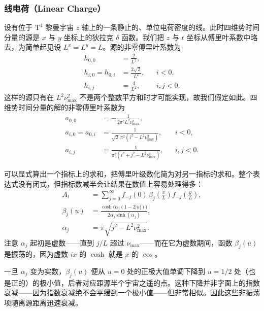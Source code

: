 \subsubsection{线电荷（Linear Charge）}

设有位于 $\text{T}^{4}$ 黎曼宇宙 $z$ 轴上的一条静止的、单位电荷密度的线。此时四维势时间分量的源是 $x$ 与 $y$ 坐标上的狄拉克 $\delta$ 函数。我们把 $z$ 与 $t$ 坐标从傅里叶系数中略去，为简单起见设 $L^{x}=L^{y}=L$。源的非零傅里叶系数为
\begin{align}
h_{0,0} &= \frac{2}{L^{2}},\\
h_{i,0} = h_{0,i} &= \frac{2\sqrt2}{L^{2}}, && i<0,\\
h_{i,j} &= \frac{4}{L^{2}}, && i,j<0.
\end{align}
这样的源只有在 $L^{2}\nu_{\max}^{2}$ 不是两个整数平方和时才可能实现，故我们假定如此。四维势时间分量的解的非零傅里叶系数为
\begin{align}
a_{0,0} &= -\frac{1}{2\pi^{2} L^{2}\nu_{\max}^{2}},\\
a_{i,0} = a_{0,i} &= \frac{1}{\sqrt2\,\pi^{2}(i^{2}-L^{2}\nu_{\max}^{2})}, && i<0,\\
a_{i,j} &= \frac{1}{\pi^{2}(i^{2}+j^{2}-L^{2}\nu_{\max}^{2})}, && i,j<0.
\end{align}


可以显式算出一个指标上的求和，把傅里叶级数化简为对另一指标的求和。整个表达式没有闭式，但指标数减半会让结果在数值上容易处理得多：
\begin{align}
A_{t} &= \sum_{j=0}^{\infty} f_{-j}(0)\,\beta_{j}\!\left(\frac{x}{L}\right) f_{-j}\!\left(\frac{y}{L}\right),\\
\beta_{j}(u) &= \frac{\cosh\!\bigl(\alpha_{j}(1-2|u|)\bigr)}{2\alpha_{j}\sinh(\alpha_{j})},\\
\alpha_{j} &= \pi\sqrt{j^{2}-L^{2}\nu_{\max}^{2}}.
\end{align}
注意 $\alpha_{j}$ 起初是虚数——直到 $j/L$ 超过 $\nu_{\max}$——而在它为虚数期间，函数 $\beta_{j}(u)$ 是振荡的，因为虚数 $ix$ 的 $\cosh$ 就是 $x$ 的 $\cos$。

一旦 $\alpha_{j}$ 变为实数，$\beta_{j}(u)$ 便从 $u=0$ 处的正极大值单调下降到 $u=1/2$ 处（也是正的）的极小值，后者对应距源半个宇宙之遥的点。这种下降并非字面上的指数衰减——因为指数衰减绝不会平缓到一个极小值——但非常相似。因此这些非振荡项随离源距离迅速衰减。

